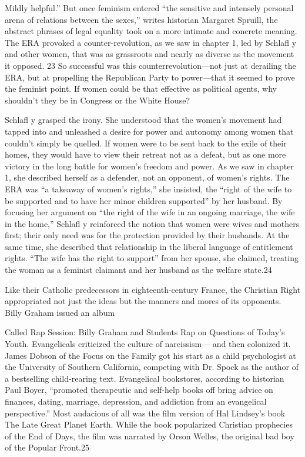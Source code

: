  \par 
Mildly helpful.” But once feminism entered “the sensitive and intensely personal arena of relations between the sexes,” writes historian Margaret Spruill, the abstract phrases of legal equality took on a more intimate and concrete meaning. The ERA provoked a counter-revolution, as we saw in chapter 1, led by Schlafl y and other women, that was as grassroots and nearly as diverse as the movement it opposed. {\color{blue}23} So successful was this counterrevolution—not just at derailing the ERA, but at propelling the Republican Party to power—that it seemed to prove the feminist point. If women could be that effective as political agents, why shouldn’t they be in Congress or the White House?
 \par 
Schlafl y grasped the irony. She understood that the women’s movement had tapped into and unleashed a desire for power and autonomy among women that couldn’t simply be quelled. If women were to be sent back to the exile of their homes, they would have to view their retreat not as a defeat, but as one more victory in the long battle for women’s freedom and power. As we saw in chapter 1, she described herself as a defender, not an opponent, of women’s rights. The ERA was “a takeaway of women’s rights,” she insisted, the “right of the wife to be supported and to have her minor children supported” by her husband. By focusing her argument on “the right of the wife in an ongoing marriage, the wife in the home,” Schlafl y reinforced the notion that women were wives and mothers first; their only need was for the protection provided by their husbands. At the same time, she described that relationship in the liberal language of entitlement rights. “The wife has the right to support” from her spouse, she claimed, treating the woman as a feminist claimant and her husband as the welfare state.{\color{blue}24}
 \par 
Like their Catholic predecessors in eighteenth-century France, the Christian Right appropriated not just the ideas but the manners and mores of its opponents. Billy Graham issued an album
 \par 
Called Rap Session: Billy Graham and Students Rap on Questions of Today’s Youth. Evangelicals criticized the culture of narcissism— and then colonized it. James Dobson of the Focus on the Family got his start as a child psychologist at the University of Southern California, competing with Dr. Spock as the author of a bestselling child-rearing text. Evangelical bookstores, according to historian Paul Boyer, “promoted therapeutic and self-help books off bring advice on finances, dating, marriage, depression, and addiction from an evangelical perspective.” Most audacious of all was the film version of Hal Lindsey’s book The Late Great Planet Earth. While the book popularized Christian prophecies of the End of Days, the film was narrated by Orson Welles, the original bad boy of the Popular Front.{\color{blue}25}
